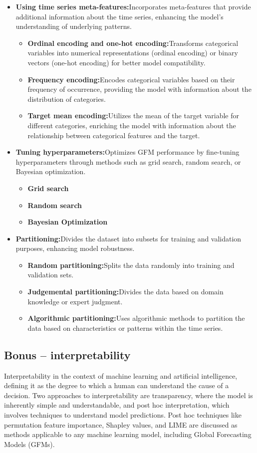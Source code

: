 \documentclass{article}
\begin{document}
\begin{itemize}
    \item \textbf{Using time series meta-features:}Incorporates meta-features that provide additional information about the time series, enhancing the model's understanding of underlying patterns.
    \begin{itemize}
    \item \textbf{Ordinal encoding and one-hot encoding:}Transforms categorical variables into numerical representations (ordinal encoding) or binary vectors (one-hot encoding) for better model compatibility.
    \item \textbf{Frequency encoding:}Encodes categorical variables based on their frequency of occurrence, providing the model with information about the distribution of categories.
    \item \textbf{Target mean encoding:}Utilizes the mean of the target variable for different categories, enriching the model with information about the relationship between categorical features and the target.
    \end{itemize}
    \item \textbf{Tuning hyperparameters:}Optimizes GFM performance by fine-tuning hyperparameters through methods such as grid search, random search, or Bayesian optimization.
    \begin{itemize}
    \item \textbf{Grid search}
    \item \textbf{Random search}
    \item \textbf{Bayesian Optimization}
    \end{itemize}
    \item \textbf{Partitioning:}Divides the dataset into subsets for training and validation purposes, enhancing model robustness.
    \begin{itemize}
    \item \textbf{Random partitioning:}Splits the data randomly into training and validation sets.
    \item \textbf{Judgemental partitioning:}Divides the data based on domain knowledge or expert judgment.
    \item \textbf{Algorithmic partitioning:}Uses algorithmic methods to partition the data based on characteristics or patterns within the time series.
    \end{itemize}
    

\end{itemize}


\subsection{Bonus – interpretability}
Interpretability in the context of machine learning and artificial intelligence, defining it as the degree to which a human can understand the cause of a decision. Two approaches to interpretability are transparency, where the model is inherently simple and understandable, and post hoc interpretation, which involves techniques to understand model predictions. Post hoc techniques like permutation feature importance, Shapley values, and LIME are discussed as methods applicable to any machine learning model, including Global Forecasting Models (GFMs).
\end{document}

